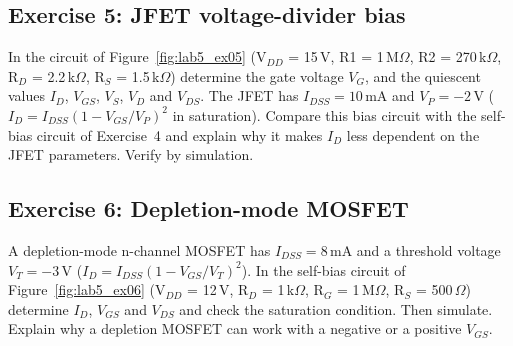 

\subsection{Exercise 5: JFET voltage-divider bias}
In the circuit of Figure~\ref{fig:lab5_ex05} (V$_{DD}$ = 15\,V, R1 = 1\,M$\Omega$, R2 = 270\,k$\Omega$, R$_D$ = 2.2\,k$\Omega$, R$_S$ = 1.5\,k$\Omega$) determine the gate voltage $V_G$, and the quiescent values $I_D$, $V_{GS}$, $V_S$, $V_D$ and $V_{DS}$. The JFET has $I_{DSS}=10$\,mA and $V_P=-2$\,V ($I_D=I_{DSS}(1-V_{GS}/V_P)^2$ in saturation). Compare this bias circuit with the self-bias circuit of Exercise~4 and explain why it makes $I_D$ less dependent on the JFET parameters. Verify by simulation.






\subsection{Exercise 6: Depletion-mode MOSFET}
A depletion-mode n-channel MOSFET has $I_{DSS}=8$\,mA and a threshold voltage $V_T=-3$\,V ($I_D=I_{DSS}(1-V_{GS}/V_T)^2$). In the self-bias circuit of Figure~\ref{fig:lab5_ex06} (V$_{DD}$ = 12\,V, R$_D$ = 1\,k$\Omega$, R$_G$ = 1\,M$\Omega$, R$_S$ = 500\,$\Omega$) determine $I_D$, $V_{GS}$ and $V_{DS}$ and check the saturation condition. Then simulate. Explain why a depletion MOSFET can work with a negative or a positive $V_{GS}$.

